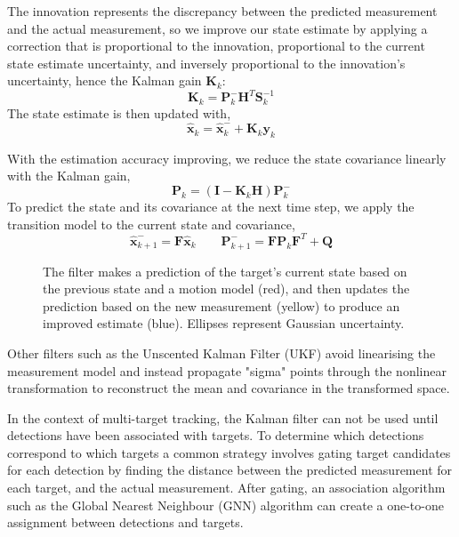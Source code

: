 The innovation represents the discrepancy between the predicted measurement and the 
actual measurement, so we improve our state estimate by applying a correction
that is proportional to the innovation, proportional to the current state estimate 
uncertainty, and inversely proportional to the innovation's
uncertainty, hence the Kalman gain \(\mathbf{K}_k\):
\begin{equation}
    \mathbf{K}_k = \mathbf{P}_k^- \mathbf{H}^T \mathbf{S}_k^{-1}
\end{equation} 
The state estimate is then updated with,
\begin{equation}
    \hat{\mathbf{x}}_k = \hat{\mathbf{x}}_k^- + \mathbf{K}_k \mathbf{y}_k
\end{equation}

With the estimation accuracy improving, we reduce the state covariance linearly
with the Kalman gain, 
\begin{equation}
    \mathbf{P}_k = (\mathbf{I} - \mathbf{K}_k \mathbf{H}) \mathbf{P}_k^-
\end{equation}
To predict the state and its covariance at the next time step, we apply the transition
model to the current state and covariance,
\begin{equation}
    \hat{\mathbf{x}}_{k+1}^- = \mathbf{F} \hat{\mathbf{x}}_k \qquad \mathbf{P}_{k+1}^- = \mathbf{F} \mathbf{P}_k \mathbf{F}^T + \mathbf{Q}
\end{equation} 

\begin{figure}[htb]
    \label{fig:kalman_filter}
    \caption{The filter makes a prediction of the target's current state based
    on the previous state and a motion model (red), and then updates the prediction based 
    on the new measurement (yellow) to produce an improved estimate (blue). Ellipses 
    represent Gaussian uncertainty.}
\end{figure}


Other filters such as the Unscented Kalman Filter (UKF) \cite{julier1997newextension} 
avoid linearising the measurement model and instead propagate "sigma" points 
through the nonlinear transformation to reconstruct the mean and covariance in the 
transformed space. 

In the context of multi-target tracking, the Kalman filter can not be used until 
detections have been associated with targets. To determine which detections 
correspond to which targets a common strategy involves gating target candidates 
for each detection by finding the distance between the predicted measurement for 
each target, and the actual measurement. 
After gating, an association algorithm such as the Global Nearest Neighbour 
(GNN) algorithm can create a one-to-one assignment between detections 
and targets.


